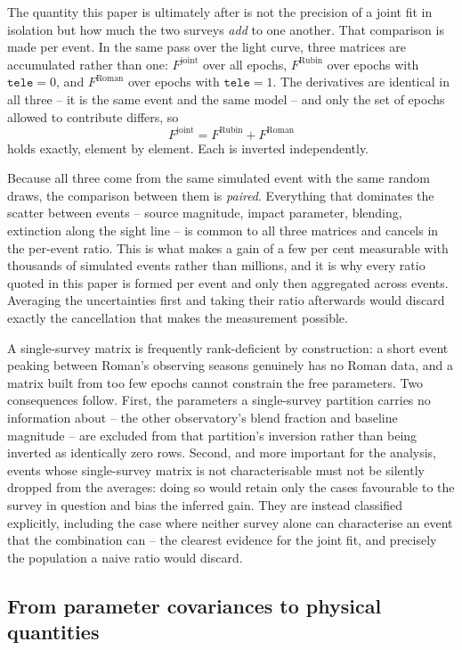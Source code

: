 \documentclass[english,10pt,a4paper]{article}
\begin{document}
	The quantity this paper is ultimately after is not the precision of a joint fit in isolation but how much the two surveys \emph{add} to one another. That comparison is made per event. In the same pass over the light curve, three matrices are accumulated rather than one: $F^{\mathrm{joint}}$ over all epochs, $F^{\mathrm{Rubin}}$ over epochs with $\texttt{tele}=0$, and $F^{\mathrm{Roman}}$ over epochs with $\texttt{tele}=1$. The derivatives are identical in all three -- it is the same event and the same model -- and only the set of epochs allowed to contribute differs, so
	\[
	F^{\mathrm{joint}} = F^{\mathrm{Rubin}} + F^{\mathrm{Roman}}
	\]
	holds exactly, element by element. Each is inverted independently.
	
	Because all three come from the same simulated event with the same random draws, the comparison between them is \emph{paired}. Everything that dominates the scatter between events -- source magnitude, impact parameter, blending, extinction along the sight line -- is common to all three matrices and cancels in the per-event ratio. This is what makes a gain of a few per cent measurable with thousands of simulated events rather than millions, and it is why every ratio quoted in this paper is formed per event and only then aggregated across events. Averaging the uncertainties first and taking their ratio afterwards would discard exactly the cancellation that makes the measurement possible.
	
	A single-survey matrix is frequently rank-deficient by construction: a short event peaking between Roman's observing seasons genuinely has no Roman data, and a matrix built from too few epochs cannot constrain the free parameters. Two consequences follow. First, the parameters a single-survey partition carries no information about -- the other observatory's blend fraction and baseline magnitude -- are excluded from that partition's inversion rather than being inverted as identically zero rows. Second, and more important for the analysis, events whose single-survey matrix is not characterisable must not be silently dropped from the averages: doing so would retain only the cases favourable to the survey in question and bias the inferred gain. They are instead classified explicitly, including the case where neither survey alone can characterise an event that the combination can -- the clearest evidence for the joint fit, and precisely the population a naive ratio would discard.
	
	\subsection{From parameter covariances to physical quantities}
	
\end{document}
